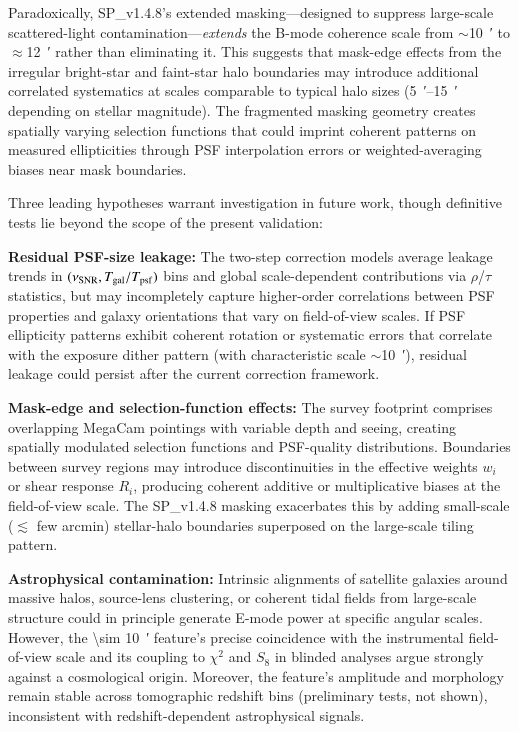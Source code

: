 \documentclass{aa}
\begin{document}
Paradoxically, SP\_v1.4.8's extended masking—designed to suppress large-scale scattered-light contamination—\emph{extends} the B-mode coherence scale from $\sim$\SI{10}{\arcmin} to $\approx$\SI{12}{\arcmin} rather than eliminating it. This suggests that mask-edge effects from the irregular bright-star and faint-star halo boundaries may introduce additional correlated systematics at scales comparable to typical halo sizes (\SIrange{5}{15}{\arcmin} depending on stellar magnitude). The fragmented masking geometry creates spatially varying selection functions that could imprint coherent patterns on measured ellipticities through PSF interpolation errors or weighted-averaging biases near mask boundaries.

Three leading hypotheses warrant investigation in future work, though definitive tests lie beyond the scope of the present validation:

\textbf{Residual PSF-size leakage:} The two-step correction models average leakage trends in $(\nu_{\rm SNR}, T_{\rm gal}/T_{\rm psf})$ bins and global scale-dependent contributions via $\rho$/$\tau$ statistics, but may incompletely capture higher-order correlations between PSF properties and galaxy orientations that vary on field-of-view scales. If PSF ellipticity patterns exhibit coherent rotation or systematic errors that correlate with the exposure dither pattern (with characteristic scale $\sim$\SI{10}{\arcmin}), residual leakage could persist after the current correction framework.

\textbf{Mask-edge and selection-function effects:} The survey footprint comprises overlapping MegaCam pointings with variable depth and seeing, creating spatially modulated selection functions and PSF-quality distributions. Boundaries between survey regions may introduce discontinuities in the effective weights $w_i$ or shear response $R_i$, producing coherent additive or multiplicative biases at the field-of-view scale. The SP\_v1.4.8 masking exacerbates this by adding small-scale ($\lesssim$ few arcmin) stellar-halo boundaries superposed on the large-scale tiling pattern.

\textbf{Astrophysical contamination:} Intrinsic alignments of satellite galaxies around massive halos, source-lens clustering, or coherent tidal fields from large-scale structure could in principle generate E-mode power at specific angular scales. However, the \SI{\sim 10}{\arcmin} feature's precise coincidence with the instrumental field-of-view scale and its coupling to $\chi^2$ and $S_8$ in blinded analyses argue strongly against a cosmological origin. Moreover, the feature's amplitude and morphology remain stable across tomographic redshift bins (preliminary tests, not shown), inconsistent with redshift-dependent astrophysical signals.
\end{document}
